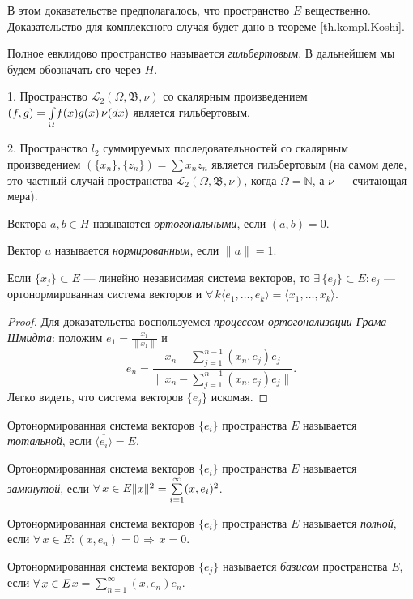 \documentclass[12pt,titlepage, a4paper]{article}
\begin{document}
\begin{zam}
В этом доказательстве предполагалось, что пространство $E$
вещественно. Доказательство для комплексного случая будет дано в
теореме \ref{th.kompl.Koshi}.
\end{zam}

\begin{defen}
Полное евклидово пространство называется \emph{гильбертовым}. В
дальнейшем мы будем обозначать его через $H$.
\end{defen}

\prim

1. Пространство $\mathcal{L}_2(\Omega,\mathfrak{B},\nu)$ со
скалярным произведением
$(f,g)\p=\int\limits_\Omega\!f(x)g(x)\,\nu(dx)$ является
гильбертовым.

2. Пространство $l_2$ суммируемых последовательностей со скалярным
произведением $(\{x_n\},\{z_n\})=\sum x_nz_n$ является гильбертовым
(на самом деле, это частный случай пространства
$\mathcal{L}_2(\Omega,\mathfrak{B},\nu)$, когда $\Omega=\mathbb{N}$,
а $\nu$ --- считающая мера).

\begin{defen}
Вектора $a,b\in H$ называются \emph{ортогональными}, если $(a,b)=0$.

Вектор $a$ называется \emph{нормированным}, если $\|a\|=1$.
\end{defen}

\begin{predl}
Если $\{x_j\}\subset E$ --- линейно независимая система векторов, то
$\exists\,\{e_j\}\subset E:{e_j}$ --- ортонормированная система
векторов и $\forall\,k$\;\;$\langle e_1,\ldots,e_k\rangle=\langle
x_1,\ldots,x_k\rangle$.
\end{predl}

\begin{proof}
Для доказательства воспользуемся \emph{процессом ортогонализации
Грама--Шмидта}: положим $e_1=\frac{x_1}{\|x_1\|}$ и
$$e_n=\frac{x_n-\sum\limits_{j=1}^{n-1}
(x_n,e_j)e_j}{\Big\|x_n-\sum\limits_{j=1}^{n-1}
(x_n,e_j)e_j\Big\|}.$$ Легко видеть, что система векторов $\{e_j\}$
искомая.
\end{proof}

\begin{defen}
Ортонормированная система векторов $\{e_i\}$ простра\-нства $E$
называется \emph{тотальной}, если $\overline{\langle e_i\rangle}=E$.

Ортонормированная система векторов $\{e_i\}$ пространства $E$
называется \emph{замкнутой}, если $\forall\,x\in
E$\;\;$\|x\|^2\p=\sum\limits_{i=1}^\infty (x,e_i)^2$.

Ортонормированная система векторов $\{e_i\}$ пространства $E$
называется \emph{полной}, если $\forall\,x\in E: (x,e_n)=0$
$\p\Rightarrow$ $x=0$.

Ортонормированная система векторов $\{e_j\}$ называется
\emph{базисом} пространства $E$, если $\forall\,x\p\in
E$\;\;$x=\sum\limits_{n=1}^\infty (x,e_n)e_n$.
\end{defen}
\end{document}
